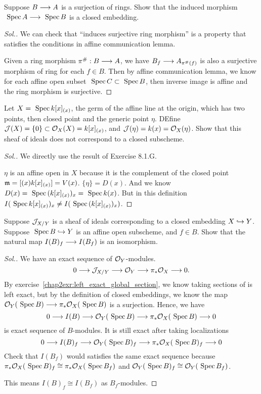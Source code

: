 \documentclass[11pt]{book} %
\begin{document}
\begin{exr}
Suppose $B\longrightarrow A$ is a surjection of rings. Show that the induced morphism $\text{ Spec\,} A\longrightarrow \text{ Spec\,} B$ is a closed embedding.
\end{exr}
\begin{proof}[Sol.]
We can check that ``induces surjective ring morphism'' is a property that satisfies the conditions in affine communication lemma. 

Given a ring morphism $\pi^\#:B\longrightarrow A$, we have $B_{f}\longrightarrow A_{\pi^\#(f)}$ is also a surjective morphism of ring for each $f\in B$. Then by affine communication lemma, we know for each affine open subset $\text{ Spec\,} C\subset\text{ Spec\,} B$, then inverse image is affine and the ring morphism is surjective.
\end{proof}
\begin{exr}
Let $X=\text{ Spec\,} k[x]_{(x)}$, the germ of the affine line at the origin, which has two points, then closed point and the generic point $\eta$. DEfine ${\cal J}(X)=\{0\}\subset {\cal O}_X(X)=k[x]_{(x)}$, and ${\cal J}(\eta)=k(x)={\cal O}_X(\eta)$. Show that this sheaf of ideals does not correspond to a closed subscheme. 
\end{exr}
\begin{proof}[Sol.]
We directly use  the result of Exercise 8.1.G.

$\eta$ is an affine open in $X$ because it is the complement of the closed point ${\mathfrak m}=[(x)k[x]_{(x)}]=V(x)$. $\{\eta\}=D(x)$. And we know $D(x)=\text{ Spec\,} (k[x]_{(x)})_x=\text{ Spec\,} k(x)$. But in this definition 
$I(\text{ Spec\,} k[x]_{(x)})_x\neq I(\text{ Spec\,} (k[x]_{(x)})_x )$.
\end{proof}
\begin{exr}
Suppose ${\cal J}_{X/Y}$ is a sheaf of ideals corresponding to a closed embedding $X\hookrightarrow Y$. Suppose $\text{ Spec\,} B\hookrightarrow Y$ is an affine open subscheme, and $f\in B$. Show that the natural map $I(B)_f\longrightarrow I(B_f)$ is an isomorphism. 
\end{exr}
\begin{proof}[Sol.]
We have an exact sequence of ${\cal O}_Y$-modules.
$$
0\longrightarrow {\cal J}_{X/Y}\longrightarrow {\cal O}_Y
\longrightarrow \pi_*{\cal O}_X\longrightarrow 0.
$$
By exercise~\ref{chap2exr:left_exact_global_section}, we know taking sections of is left exact, but by the definition of closed embeddings, we know the map ${\cal O}_Y(\text{ Spec\,} B)\longrightarrow  \pi_*{\cal O}_X(\text{ Spec\,} B)$ is a surjection. Hence, we have 
$$
0\longrightarrow I(B)\longrightarrow {\cal O}_Y(\text{ Spec\,} B)\longrightarrow  \pi_*{\cal O}_X(\text{ Spec\,} B)\longrightarrow 0
$$
is exact sequence of $B$-modules. It is still exact after taking localizations
$$
0\longrightarrow I(B)_f\longrightarrow {\cal O}_Y(\text{ Spec\,} B)_f\longrightarrow  \pi_*{\cal O}_X(\text{ Spec\,} B)_f\longrightarrow 0
$$
Check that $I(B_f)$ would satisfies the same exact sequence because $\pi_*{\cal O}_X(\text{ Spec\,} B)_f\cong  \pi_*{\cal O}_X(\text{ Spec\,} B_f)$ and $ {\cal O}_Y(\text{ Spec\,} B)_f\cong  {\cal O}_Y(\text{ Spec\,} B_f)$.

This means  $I(B)_f\cong I(B_f)$ as $B_f$-modules.
\end{proof}
\end{document}
